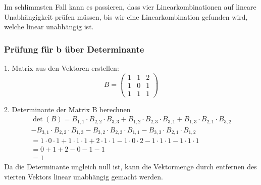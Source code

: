 Im schlimmsten Fall kann es passieren, dass vier Linearkombinationen auf
lineare Unabhängigkeit prüfen müssen, bis wir eine Linearkombination gefunden
wird, welche linear unabhängig ist.

\subsubsection{Prüfung für b über Determinante}
1.  Matrix aus den Vektoren erstellen:
\[ B = \begin{pmatrix} 1 & 1 & 2 \\ 1 & 0 & 1 \\ 1 & 1 & 1 \end{pmatrix} \]

2. Determinante der Matrix B berechnen
\begin{align*}
    \det(B) = B_{1,1} \cdot B_{2,2} \cdot B_{3,3} + B_{1,2} \cdot B_{2,3} \cdot B_{3,1} + B_{1,3} \cdot B_{2,1} \cdot B_{3,2} \\ - B_{3,1} \cdot B_{2,2} \cdot B_{1,3} - B_{3,2} \cdot B_{2,3} \cdot B_{1,1} - B_{3,3} \cdot B_{2,1} \cdot B_{1,2}\\
    = 1 \cdot 0 \cdot 1 + 1 \cdot 1 \cdot 1 + 2 \cdot 1 \cdot 1 - 1 \cdot 0 \cdot 2 - 1 \cdot 1 \cdot 1 - 1 \cdot 1 \cdot 1   \\
    = 0 + 1 + 2 - 0 - 1 - 1                                                                                                   \\
    = 1
\end{align*}
Da die Determinante ungleich null ist, kann die Vektormenge durch entfernen des vierten Vektors linear unabhängig gemacht werden.

